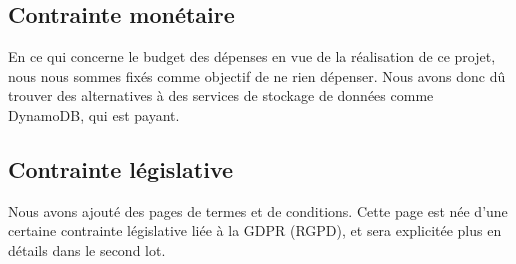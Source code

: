 \subsection{Contrainte monétaire}
\label{Contrainte monétaire}

En ce qui concerne le budget des dépenses en vue de la réalisation de ce projet, nous nous sommes fixés comme objectif de ne rien dépenser. Nous avons donc dû trouver des alternatives à des services de stockage de données comme DynamoDB, qui est payant.

\subsection{Contrainte législative}

Nous avons ajouté des pages de termes et de conditions. Cette page est née d'une certaine contrainte législative liée à la GDPR\parencite{Ref3} (RGPD), et sera explicitée plus en détails dans le second lot.
